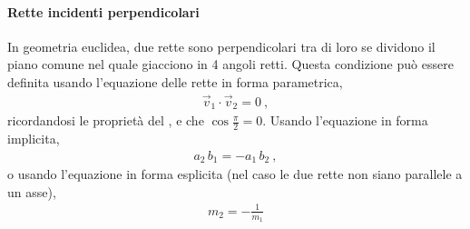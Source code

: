 \documentclass[letterpaper,10pt,english]{jupyterBook}
\begin{document}
\paragraph{Rette incidenti perpendicolari}
\label{\detokenize{ch/analytic_geometry/analytic_geometry_2d/lines:rette-incidenti-perpendicolari}}
\sphinxAtStartPar
In geometria euclidea, due rette sono perpendicolari tra di loro se dividono il piano comune nel quale giacciono in 4 angoli retti. Questa condizione può essere definita usando l’equazione delle rette in forma parametrica,
\begin{equation*}
\begin{split}\vec{v}_1 \cdot \vec{v}_2 = 0 \ ,\end{split}
\end{equation*}
\sphinxAtStartPar
ricordandosi le proprietà del {\hyperref[\detokenize{ch/algebra/vector-algebra-euclidean-space:math-hs-algebra-vector-euclidean-space-inner-product}]{}}, e che \(\cos \frac{\pi}{2} = 0\).
Usando l’equazione in forma implicita,
\begin{equation*}
\begin{split}a_2 \, b_1 = - a_1 \, b_2 \ ,\end{split}
\end{equation*}
\sphinxAtStartPar
o usando l’equazione in forma esplicita (nel caso le due rette non siano parallele a un asse),
\begin{equation*}
\begin{split}m_2 = -\frac{1}{m_1}\end{split}
\end{equation*}
\end{document}
